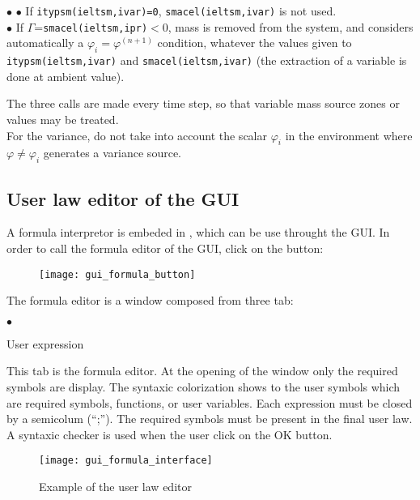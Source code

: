 {{{\begin{list}{$\bullet$}{}
$\bullet$ If \texttt{itypsm(ieltsm,ivar)=0}, \texttt{smacel(ieltsm,ivar)}
      is not used.\\
$\bullet$ If $\Gamma$=\texttt{smacel(ieltsm,ipr)}$<$0, mass is removed from
      the system, and \CS considers automatically a
      $\varphi_i=\varphi^{(n+1)}$ condition, whatever the values given
      to \texttt{itypsm(ieltsm,ivar)} and \texttt{smacel(ieltsm,ivar)}
      (the extraction of a variable is done at ambient value).
\end{list}



The three calls are made every time step, so that variable mass source
zones or values may be treated.\\

For the variance, do not take into account the scalar $\varphi_i$ in the environment
where $\varphi\ne\varphi_i$ generates a variance source.

\subsection{User law editor of the GUI}

A formula interpretor is embeded in \CS, which can be use throught the GUI.
In order to call the formula editor of the GUI, click on the button:

\begin{figure}[!ht]
\begin{center}
\texttt{[image: gui\_formula\_button]}
\label{fig:mei_button}
\end{center}
\end{figure}

The formula editor is a window composed from three tab:
\begin{list}{$\bullet$}{}
\item User expression

This tab is the formula editor. At the opening of the
window only the required symbols are display.
The syntaxic colorization shows to the user symbols which are
required symbols, functions, or user variables.
Each expression must be closed by a semicolum (``;''). The
required symbols must be present in the final user law. A
syntaxic checker is used when the user click on the OK button.

\begin{figure}[!ht]
\begin{center}
\texttt{[image: gui\_formula\_interface]}
\caption{Example of the user law editor}
\label{fig:mei_editor}
\end{center}
\end{figure}


\end{list}}}}
